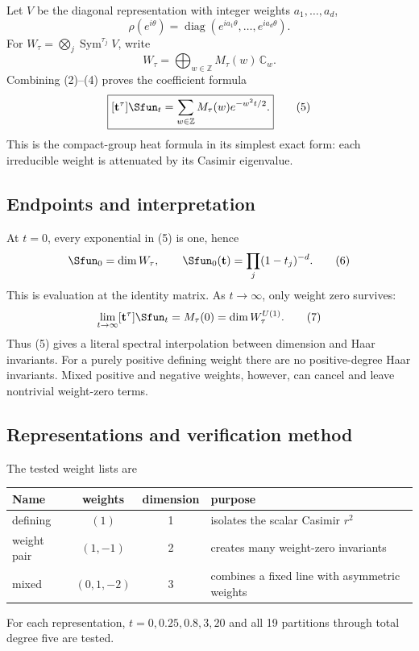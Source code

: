 \documentclass[10pt]{article}
\begin{document}
Let $V$ be the diagonal representation with integer weights
$a_1,\ldots,a_d$,
\begin{equation}
\rho(e^{i\theta})=\operatorname{diag}
(e^{ia_1\theta},\ldots,e^{ia_d\theta}).                    \tag{3}
\end{equation}
For $W_\tau=\bigotimes_j\operatorname{Sym}^{\tau_j}V$, write
\begin{equation}
W_\tau=\bigoplus_{w\in\mathbb Z}M_\tau(w)\,\mathbb C_w.  \tag{4}
\end{equation}
Combining (2)--(4) proves the coefficient formula
\begin{equation}
\boxed{
[\mathbf t^\tau]\Sfun_t
=\sum_{w\in\mathbb Z}M_\tau(w)e^{-w^2t/2}.}               \tag{5}
\end{equation}
This is the compact-group heat formula in its simplest exact form: each
irreducible weight is attenuated by its Casimir eigenvalue.

\subsection{Endpoints and interpretation}
At $t=0$, every exponential in (5) is one, hence
\begin{equation}
[\mathbf t^\tau]\Sfun_0=\dim W_\tau,
\qquad
\Sfun_0(\mathbf t)=\prod_j(1-t_j)^{-d}.                    \tag{6}
\end{equation}
This is evaluation at the identity matrix.  As $t\to\infty$, only weight zero
survives:
\begin{equation}
\lim_{t\to\infty}[\mathbf t^\tau]\Sfun_t=M_\tau(0)
=\dim W_\tau^{U(1)}.                                       \tag{7}
\end{equation}
Thus (5) gives a literal spectral interpolation between dimension and Haar
invariants.  For a purely positive defining weight there are no positive-degree
Haar invariants.  Mixed positive and negative weights, however, can cancel and
leave nontrivial weight-zero terms.

\subsection{Representations and verification method}
The tested weight lists are
\begin{center}
\begin{tabular}{@{}lccp{7.1cm}@{}}
\toprule
Name & weights & dimension & purpose\\
\midrule
defining & $(1)$ & 1 & isolates the scalar Casimir $r^2$\\
weight pair & $(1,-1)$ & 2 & creates many weight-zero invariants\\
mixed & $(0,1,-2)$ & 3 & combines a fixed line with asymmetric weights\\
\bottomrule
\end{tabular}
\end{center}
For each representation, $t=0,0.25,0.8,3,20$ and all 19 partitions through
total degree five are tested.
\end{document}
